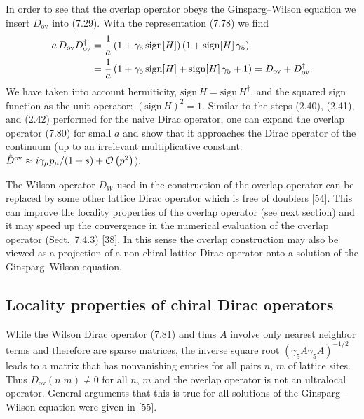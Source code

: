 In order to see that the overlap operator obeys the Ginsparg--Wilson equation
we insert $D_{\mathrm{ov}}$ into (7.29). With the representation (7.78) we
find
\begin{align}
  a\,D_{\mathrm{ov}}D_{\mathrm{ov}}^\dagger
  &= \frac{1}{a}\left(1+\gamma_5\,\mathrm{sign}[H]\right)
     \left(1+\mathrm{sign}[H]\,\gamma_5\right) \notag\\
  &= \frac{1}{a}\left(1+\gamma_5\,\mathrm{sign}[H] + \mathrm{sign}[H]\,\gamma_5 + 1\right)
  = D_{\mathrm{ov}} + D_{\mathrm{ov}}^\dagger .
\end{align}
We have taken into account hermiticity, $\mathrm{sign}\,H =
\mathrm{sign}\,H^\dagger$, and the squared sign function as the unit operator:
$(\mathrm{sign}\,H)^2 = 1$. Similar to the steps (2.40), (2.41), and (2.42)
performed for the naive Dirac operator, one can expand the overlap operator
(7.80) for small $a$ and show that it approaches the Dirac operator of the
continuum (up to an irrelevant multiplicative constant:
$\hat{D}^{\mathrm{ov}} \approx i\gamma_\mu p_\mu/(1+s) + \mathcal{O}\left(p^2\right)$).

The Wilson operator $D_W$ used in the construction of the overlap operator can
be replaced by some other lattice Dirac operator which is free of doublers
[54]. This can improve the locality properties of the overlap operator (see
next section) and it may speed up the convergence in the numerical evaluation
of the overlap operator (Sect.~7.4.3) [38]. In this sense the overlap
construction may also be viewed as a projection of a non-chiral lattice Dirac
operator onto a solution of the Ginsparg--Wilson equation.

\subsection{Locality properties of chiral Dirac operators}

While the Wilson Dirac operator (7.81) and thus $A$ involve only nearest
neighbor terms and therefore are sparse matrices, the inverse square root
$(\gamma_5 A\gamma_5 A)^{-1/2}$ leads to a matrix that has nonvanishing entries
for all pairs $n$, $m$ of lattice sites. Thus $D_{\mathrm{ov}}(n|m) \neq 0$ for
all $n$, $m$ and the overlap operator is not an ultralocal operator. General
arguments that this is true for all solutions of the Ginsparg--Wilson equation
were given in [55].

